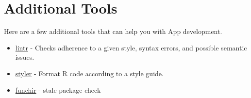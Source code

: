 \documentclass[]{book}
\providecommand{\tightlist}{%
  \setlength{\itemsep}{0pt}\setlength{\parskip}{0pt}}
\begin{document}
\hypertarget{addTools}{%
\chapter{Additional Tools}\label{addTools}}

Here are a few additional tools that can help you with App development.

\begin{itemize}
\tightlist
\item
  \href{https://github.com/jimhester/lintr}{lintr} - Checks adherence to a
  given style, syntax errors, and possible semantic issues.
\item
  \href{https://www.tidyverse.org/articles/2017/12/styler-1.0.0/}{styler} -
  Format R code according to a style guide.
\item
  \href{https://github.com/MichaelChirico/funchir}{funchir} - stale package
  check
\end{itemize}


\end{document}

